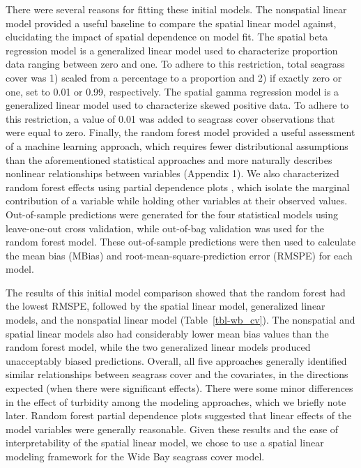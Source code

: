 \documentclass[
  letterpaper,
  DIV=11,
  numbers=noendperiod]{scrartcl}
\begin{document}
There were several reasons for fitting these initial models. The
nonspatial linear model provided a useful baseline to compare the
spatial linear model against, elucidating the impact of spatial
dependence on model fit. The spatial beta regression model is a
generalized linear model used to characterize proportion data ranging
between zero and one. To adhere to this restriction, total seagrass
cover was 1) scaled from a percentage to a proportion and 2) if exactly
zero or one, set to 0.01 or 0.99, respectively. The spatial gamma
regression model is a generalized linear model used to characterize
skewed positive data. To adhere to this restriction, a value of 0.01 was
added to seagrass cover observations that were equal to zero. Finally,
the random forest model provided a useful assessment of a machine
learning approach, which requires fewer distributional assumptions than
the aforementioned statistical approaches and more naturally describes
nonlinear relationships between variables (Appendix 1). We also
characterized random forest effects using partial dependence plots
\citep{greenwell2017pdp}, which isolate the marginal contribution of a
variable while holding other variables at their observed values.
Out-of-sample predictions were generated for the four statistical models
using leave-one-out cross validation, while out-of-bag validation was
used for the random forest model. These out-of-sample predictions were
then used to calculate the mean bias (MBias) and
root-mean-square-prediction error (RMSPE) for each model.

The results of this initial model comparison showed that the random
forest had the lowest RMSPE, followed by the spatial linear model,
generalized linear models, and the nonspatial linear model
(Table~\ref{tbl-wb_cv}). The nonspatial and spatial linear models also
had considerably lower mean bias values than the random forest model,
while the two generalized linear models produced unacceptably biased
predictions. Overall, all five approaches generally identified similar
relationships between seagrass cover and the covariates, in the
directions expected (when there were significant effects). There were
some minor differences in the effect of turbidity among the modeling
approaches, which we briefly note later. Random forest partial
dependence plots \citep{greenwell2017pdp} suggested that linear effects
of the model variables were generally reasonable. Given these results
and the ease of interpretability of the spatial linear model, we chose
to use a spatial linear modeling framework for the Wide Bay seagrass
cover model.
\end{document}

